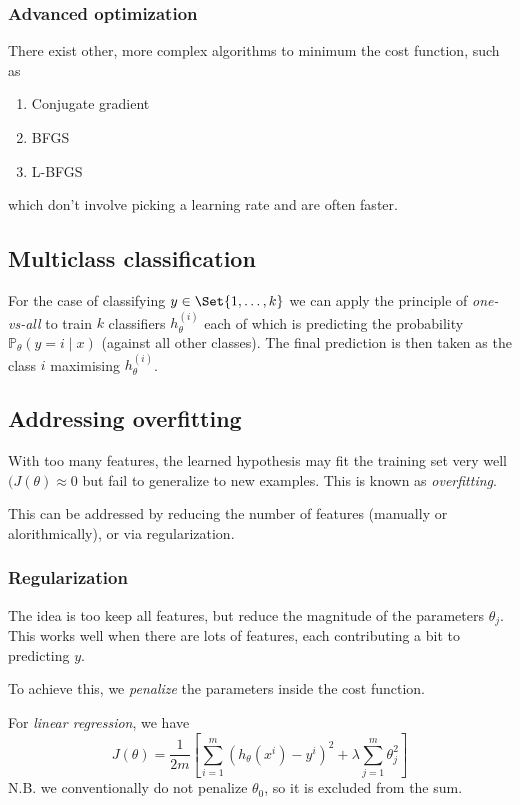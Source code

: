 \documentclass[a4paper,12pt]{article}
\theoremstyle{definition}
\renewcommand{\Pr}{\mathbb{P}}
\providecommand\given{} %
\renewcommand{\given}{\mid}
\begin{document}
\subsubsection{Advanced optimization}
There exist other, more complex algorithms to minimum the cost function, such as
\begin{enumerate}
\item Conjugate gradient
\item BFGS
\item L-BFGS
\end{enumerate}
which don't involve picking a learning rate and are often faster.

\subsection{Multiclass classification}
For the case of classifying $y \in \Set{1, \ldots, k}$ we can apply the principle of \emph{one-vs-all} to train $k$ classifiers $h_{\theta}^{(i)}$ each of which is predicting the probability $\Pr_{\theta}(y = i \given x)$ (against all other classes). The final prediction is then taken as the class $i$ maximising $h_{\theta}^{(i)}$.

\subsection{Addressing overfitting}
With too many features, the learned hypothesis may fit the training set very well $(J(\theta) \approx 0$ but fail to generalize to new examples. This is known as \emph{overfitting}.

This can be addressed by reducing the number of features (manually or alorithmically), or via regularization. 

\subsubsection{Regularization}
\label{logistic-regularization}
The idea is too keep all features, but reduce the magnitude of the parameters $\theta_j$. This works well when there are lots of features, each contributing a bit to predicting $y$.

To achieve this, we \emph{penalize} the parameters inside the cost function.

For \emph{linear regression}, we have
\[
J(\theta) = \frac{1}{2m} \left[ \sum_{i=1}^{m}{ \left( h_{\theta}(x^{i}) - y^{i}\right)^{2} } + \lambda \sum_{j=1}^{m} \theta_j^2 \right]
\]
N.B. we conventionally do not penalize $\theta_0$, so it is excluded from the sum.
\end{document}
